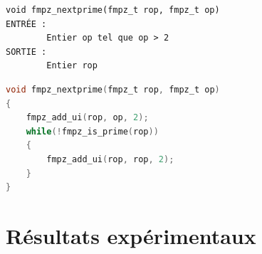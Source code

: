 \documentclass{article}%
\theoremstyle{plain}
\theoremstyle{definition}
\theoremstyle{plain}
\theoremstyle{plain}
\theoremstyle{remark}
\begin{document}
\begin{verbatim}
void fmpz_nextprime(fmpz_t rop, fmpz_t op)
ENTRÉE :
    	Entier op tel que op > 2
SORTIE :
    	Entier rop
\end{verbatim} 
\begin{lstlisting}[language=c]
void fmpz_nextprime(fmpz_t rop, fmpz_t op)
{
    fmpz_add_ui(rop, op, 2);
    while(!fmpz_is_prime(rop))
    {
        fmpz_add_ui(rop, rop, 2);
    }
}
\end{lstlisting}

\section{Résultats expérimentaux}



 
\clearpage 
\nocite{*} 


\end{document}
